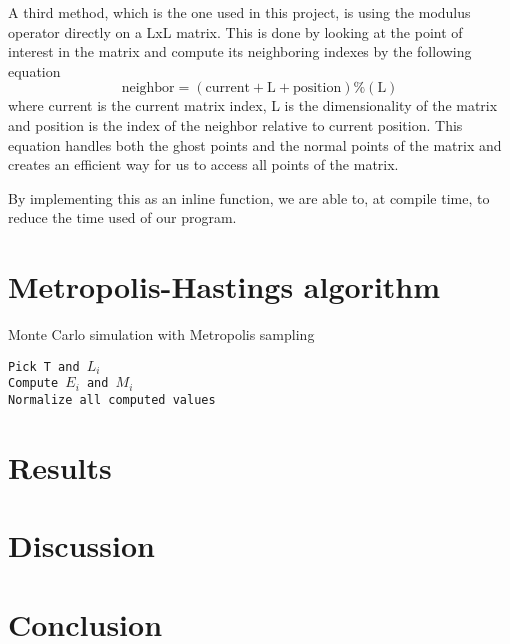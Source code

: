 \documentclass[%
reprint,
nofootinbib,
amsmath,amssymb,
aps,
]{revtex4-1}
\begin{document}
A third method, which is the one used in this project, is using the modulus operator directly on a LxL matrix. This is done by looking at the point of interest in the matrix and compute its neighboring indexes by the following equation
\begin{equation}
	\text{neighbor} = (\text{current} + \text{L} + \text{position}) \% (\text{L})
\end{equation}
where current is the current matrix index, L is the dimensionality of the matrix and position is the index of the neighbor relative to current position. 
This equation handles both the ghost points and the normal points of the matrix and creates an efficient way for us to access all points of the matrix. 

By implementing this as an inline function, we are able to, at compile time, to reduce the time used of our program. 


\section{Metropolis-Hastings algorithm}
\begin{algorithm}[H]\label{algo:metropolis}
	\SetAlgoLined
	\caption{Monte Carlo simulation with Metropolis sampling}
	\texttt{Pick T and $L_i$}	\\
	\texttt{Compute $E_i$ and $M_i$}\\
	\texttt{Normalize all computed values}
\end{algorithm}

\section{Results}	%

\section{Discussion} %

\section{Conclusion} %



\end{document}
